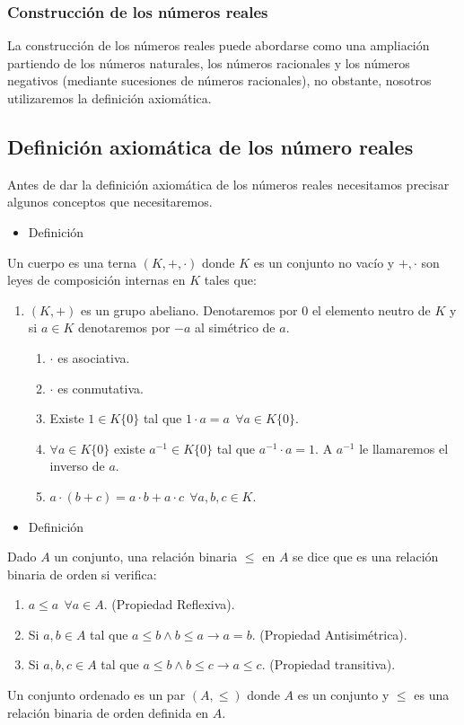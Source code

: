\documentclass[12pt]{article}
\begin{document}
\subsubsection{Construcción de los números reales}
La construcción de los números reales puede abordarse como una ampliación partiendo de los números naturales, los números racionales y los números negativos (mediante sucesiones de números racionales), no obstante, nosotros utilizaremos la definición axiomática.

\subsection{Definición axiomática de los número reales}
Antes de dar la definición axiomática de los números reales necesitamos precisar algunos conceptos que necesitaremos.
\begin{itemize}[label=\color{red}\textbullet, leftmargin=*]
	\item \color{lightblue} Definición
\end{itemize}
Un cuerpo es una terna $(K,+,\cdot)$ donde $K$ es un conjunto no vacío y $+,\cdot$ son leyes de composición internas en $K$ tales que:
\begin{enumerate}[label=\arabic*)]
	\item $(K,+)$ es un grupo abeliano. Denotaremos por 0 el elemento neutro de $K$ y si $a\in K$ denotaremos por $-a$ al simétrico de $a$.
	\begin{enumerate}[label=\alph*)]
		\item $\cdot$ es asociativa.
		\item  $\cdot$ es conmutativa.
		\item Existe $1\in K\{0\}$ tal que $1\cdot a=a~~\forall a\in K\{0\}$.
		\item $\forall a\in K\{0\}$ existe $a^{-1}\in K\{0\}$ tal que $a^{-1}\cdot a=1$. A $a^{-1}$ le llamaremos el inverso de $a$.
		\item $a\cdot(b+c)=a\cdot b+a\cdot c~~\forall a,b,c\in K$.
	\end{enumerate}
\end{enumerate}
\begin{itemize}[label=\color{red}\textbullet, leftmargin=*]
	\item \color{lightblue} Definición
\end{itemize}
Dado $A$ un conjunto, una relación binaria $\le$ en $A$ se dice que es una relación binaria de orden si verifica:
\begin{enumerate}[label=\arabic*)]
	\item $a\le a~~\forall a\in A$. (Propiedad Reflexiva).
	\item Si $a,b\in A$ tal que $a\le b\wedge b\le a\rightarrow a=b$. (Propiedad Antisimétrica).
	\item Si $a,b,c\in A$ tal que $a\le b\wedge b\le c\rightarrow a\le c$. (Propiedad transitiva).
\end{enumerate}
Un conjunto ordenado es un par $(A,\le)$ donde $A$ es un conjunto y $\le$ es una relación binaria de orden definida en $A$.
\end{document}
